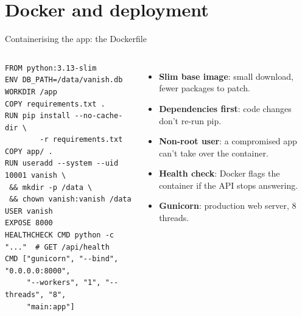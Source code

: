\documentclass[aspectratio=169,11pt]{beamer}
\newcommand{\hl}[1]{\textcolor{cobalt}{\textbf{#1}}}
\newcommand{\code}[1]{{\ttfamily\small #1}}
\begin{document}
\section{Docker and deployment}
\begin{frame}[fragile]{Containerising the app: the Dockerfile}
  \begin{columns}[T]
\begin{lstlisting}[language=Docker]
FROM python:3.13-slim
ENV DB_PATH=/data/vanish.db
WORKDIR /app
COPY requirements.txt .
RUN pip install --no-cache-dir \
        -r requirements.txt
COPY app/ .
RUN useradd --system --uid 10001 vanish \
 && mkdir -p /data \
 && chown vanish:vanish /data
USER vanish
EXPOSE 8000
HEALTHCHECK CMD python -c "..."  # GET /api/health
CMD ["gunicorn", "--bind", "0.0.0.0:8000",
     "--workers", "1", "--threads", "8",
     "main:app"]
\end{lstlisting}
    \column{0.40\textwidth}
    \begin{itemize}\small
      \item \hl{Slim base image}: small download, fewer packages to patch.
      \item \hl{Dependencies first}: code changes don't re-run \code{pip}.
      \item \hl{Non-root user}: a compromised app can't take over the container.
      \item \hl{Health check}: Docker flags the container if the API stops answering.
      \item \hl{Gunicorn}: production web server, 8 threads.
    \end{itemize}
  \end{columns}
\end{frame}
\end{document}
